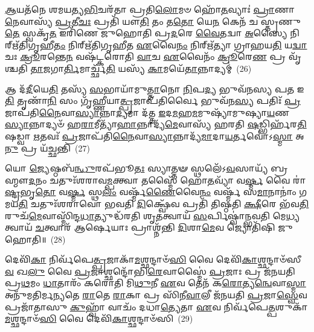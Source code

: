\-\ul{𑌆}\-𑌯𑌤᳴𑌨𑍇 𑌶𑌮𑌯𑌤𑍍𑌯\-\ul{𑌭𑌿}\-𑌚𑌰᳴𑌤𑌾 𑌪𑍍𑌰𑌤𑌿\-\ul{𑌲𑍋}\-𑌮𑍞 𑌹𑍋᳴\-\ul{𑌤}\-𑌵𑍍𑌯𑌾𑌃॑ \ul{𑌪𑍍𑌰𑌾}\-𑌣𑌾\-\ul{𑌨𑍇}\-𑌵𑌾𑌸𑍍𑌯᳴ \ul{𑌪𑍍𑌰}\-𑌤𑍀\-\ul{𑌚𑌃} 𑌪𑍍𑌰𑌤𑌿᳴ 𑌯𑍗\-\ul{𑌤𑌿} 𑌤𑌂 𑌤\-\ul{𑌤𑍋} 𑌯𑍇\-\ul{𑌨} 𑌕𑍇𑌨᳴ 𑌚 𑌸𑍍𑌤𑍃𑌣𑍁\-\ul{𑌤𑍇} 𑌸𑍍𑌵𑌕𑍃᳴\-\ul{𑌤} 𑌇𑌰𑌿᳴𑌣𑍇 𑌜𑍁𑌹𑍋𑌤𑌿 𑌪𑍍𑌰\-\ul{𑌦}\-𑌰𑍇 \ul{𑌵𑍈}\-𑌤𑌦𑍍𑌵𑌾 \ul{𑌅}\-𑌸𑍍𑌯𑍈 𑌨𑌿𑌰𑍍\mbox{}𑌋᳴𑌤𑌿𑌗𑍃𑌹𑍀\-\ul{𑌤𑌂} 𑌨𑌿𑌰𑍍\mbox{}𑌋᳴𑌤𑌿𑌗𑍃𑌹𑍀𑌤 \ul{𑌏}\-𑌵𑍈\-\ul{𑌨𑌂} 𑌨𑌿𑌰𑍍\mbox{}𑌋᳴𑌤𑍍𑌯𑌾 𑌗𑍍𑌰𑌾𑌹𑌯\-\ul{𑌤𑌿} 𑌯\-\ul{𑌦𑍍𑌵𑌾}\-𑌚𑌃 \ul{𑌕𑍍𑌰𑍂}\-𑌰𑌨𑍍𑌤𑍇\-\ul{𑌨} 𑌵𑌷᳴𑌟𑍍𑌕𑌰𑍋𑌤𑌿 \ul{𑌵𑌾}\-𑌚 \ul{𑌏}\-𑌵𑍈𑌨𑌂᳴ \ul{𑌕𑍍𑌰𑍂}\-𑌰𑍇\-\ul{𑌣} 𑌪𑍍𑌰 𑌵𑍃᳴𑌶𑍍𑌚𑌤𑌿 \ul{𑌤𑌾}\-𑌜𑌗𑌾\-\ul{𑌰𑍍𑌤𑌿}\-𑌮𑌾𑌰𑍍𑌚𑍍𑌛᳴\-\ul{𑌤𑌿} 𑌯𑌸𑍍𑌯᳴ \ul{𑌕𑌾}\-𑌮𑌯𑍇᳴\-\ul{𑌤𑌾}\-𑌨𑍍𑌨𑌾𑌦𑍍𑌯𑌮𑍍॑~(26)

𑌆 𑌦᳴\-\ul{𑌦𑍀}\-𑌯𑍇\-\ul{𑌤𑌿} 𑌤𑌸𑍍𑌯᳴ \ul{𑌸}\-𑌭𑌾𑌯𑌾᳴𑌮𑍁\-\ul{𑌤𑍍𑌤𑌾}\-𑌨𑍋 \ul{𑌨𑌿}\-𑌪\-\ul{𑌦𑍍𑌯} 𑌭𑍁𑌵᳴𑌨𑌸𑍍𑌯 𑌪\-\ul{𑌤} 𑌇\-\ul{𑌤𑌿} 𑌤𑍃𑌣𑌾᳴\-\ul{𑌨𑌿} 𑌸𑌂 𑌗𑍃᳴𑌹𑍍𑌣𑍀𑌯𑌾\-\ul{𑌤𑍍𑌪𑍍𑌰}\-𑌜𑌾𑌪᳴𑌤𑌿𑌰𑍍𑌵𑍈 𑌭𑍁𑌵᳴𑌨\-\ul{𑌸𑍍𑌯} 𑌪𑌤𑌿𑌃᳴ \ul{𑌪𑍍𑌰}\-𑌜𑌾𑌪᳴𑌤𑌿\-\ul{𑌨𑍈}\-𑌵𑌾\-\ul{𑌸𑍍𑌯𑌾}\-𑌨𑍍𑌨𑌾\-\ul{𑌦𑍍𑌯}\-𑌮𑌾 𑌦᳴𑌤𑍍𑌤 \ul{𑌇}\-𑌦\-\ul{𑌮}\-𑌹\-\ul{𑌮}\-𑌮𑍁𑌷𑍍𑌯𑌾᳴𑌮𑍁𑌷𑍍𑌯𑌾\-\ul{𑌯}\-𑌣\-\ul{𑌸𑍍𑌯𑌾}\-𑌨𑍍𑌨𑌾𑌦𑍍𑌯𑍞᳴ 𑌹\-\ul{𑌰𑌾}\-𑌮𑍀𑌤𑍍𑌯𑌾᳴\-\ul{𑌹𑌾}\-𑌨𑍍𑌨𑌾𑌦𑍍𑌯᳴\-\ul{𑌮𑍇}\-𑌵𑌾𑌸𑍍𑌯᳴ 𑌹𑌰𑌤𑌿 \ul{𑌷}\-𑌡𑍍𑌭𑌿𑌰𑍍\mbox{}𑌹᳴𑌰\-\ul{𑌤𑌿} 𑌷𑌡𑍍𑌵𑌾 \ul{𑌋}\-𑌤𑌵𑌃᳴ \ul{𑌪𑍍𑌰}\-𑌜𑌾𑌪᳴𑌤𑌿\-\ul{𑌨𑍈}\-𑌵𑌾\-\ul{𑌸𑍍𑌯𑌾}\-𑌨𑍍𑌨𑌾𑌦𑍍𑌯᳴\-\ul{𑌮𑌾}\-𑌦𑌾\-\ul{𑌯}\-𑌰𑍍𑌤𑌵𑍋॑\-𑌽\-\ul{𑌸𑍍𑌮𑌾} 𑌅\-\ul{𑌨𑍁} 𑌪𑍍𑌰 𑌯᳴𑌚𑍍𑌛𑌨𑍍𑌤𑌿~(27)

𑌯𑍋 \ul{𑌜𑍍𑌯𑍇}\-𑌷𑍍𑌠𑌬᳴\-\ul{𑌨𑍍𑌧𑍁}\-𑌰𑌪᳴𑌭𑍂\-\ul{𑌤𑌃} 𑌸𑍍𑌯𑌾𑌤𑍍𑌤𑍟 𑌸𑍍𑌥𑌲𑍇᳴\-𑌽\-\ul{𑌵}\-𑌸𑌾𑌯𑍍𑌯᳴ 𑌬𑍍𑌰𑌹𑍍𑌮𑍗\-\ul{𑌦}\-𑌨𑌂 𑌚𑌤𑍁𑌃᳴𑌶𑌰𑌾𑌵\-\ul{𑌮𑍍𑌪}\-𑌕𑍍𑌤𑍍𑌵𑌾 𑌤𑌸𑍍𑌮𑍈᳴ 𑌹𑍋\-\ul{𑌤}\-𑌵𑍍𑌯𑌾᳴ 𑌵\-\ul{𑌰𑍍𑌷𑍍𑌮} 𑌵𑍈 𑌰𑌾॑\-\ul{𑌷𑍍𑌟𑍍𑌰}\-𑌭𑍃\-\ul{𑌤𑍋} 𑌵\-\ul{𑌰𑍍𑌷𑍍𑌮} 𑌸𑍍𑌥\-\ul{𑌲𑌂} 𑌵𑌰𑍍𑌷𑍍𑌮᳴\-\ul{𑌣𑍈}\-𑌵𑍈\-\ul{𑌨𑌂} 𑌵𑌰𑍍𑌷𑍍𑌮᳴ 𑌸\-\ul{𑌮𑌾}\-𑌨𑌾𑌨𑌾𑌂॑ 𑌗𑌮𑌯\-\ul{𑌤𑌿} 𑌚𑌤𑍁𑌃᳴𑌶𑌰𑌾𑌵𑍋 𑌭𑌵𑌤𑌿 \ul{𑌦𑌿}\-𑌕𑍍𑌷𑍍𑌵𑍇᳴𑌵 𑌪𑍍𑌰𑌤𑌿᳴ 𑌤𑌿𑌷𑍍𑌠𑌤𑌿 \ul{𑌕𑍍𑌷𑍀}\-𑌰𑍇 𑌭᳴𑌵\-\ul{𑌤𑌿} 𑌰𑍁𑌚᳴\-\ul{𑌮𑍇}\-𑌵𑌾𑌸𑍍𑌮𑌿᳴\-𑌨𑍍𑌦\-\ul{𑌧𑌾}\-𑌤𑍍𑌯𑍁𑌦𑍍𑌧᳴𑌰𑌤𑌿 𑌶𑍃\-\ul{𑌤}\-𑌤𑍍𑌵𑌾𑌯᳴ \ul{𑌸}\-𑌰𑍍𑌪𑌿𑌷𑍍𑌵𑌾॑𑌨𑍍𑌭𑌵𑌤𑌿 𑌮𑍇\-\ul{𑌧𑍍𑌯}\-𑌤𑍍𑌵𑌾𑌯᳴ \ul{𑌚}\-𑌤𑍍𑌵𑌾𑌰᳴ 𑌆𑌰𑍍\mbox{}\-\ul{𑌷𑍇}\-𑌯𑌾𑌃 𑌪𑍍𑌰𑌾𑌶𑍍𑌨᳴𑌨𑍍𑌤𑌿 \ul{𑌦𑌿}\-𑌶𑌾\-\ul{𑌮𑍇}\-𑌵 𑌜𑍍𑌯𑍋𑌤𑌿᳴𑌷𑌿 𑌜𑍁𑌹𑍋𑌤𑌿॥~(28)

{\anuvakamend[{\-\ul{𑌗𑍍𑌰𑌾}\-𑌮𑍀 𑌯𑍁᳴𑌨\-\ul{𑌕𑍍𑌤𑍀}\-𑌧𑍍𑌮𑌃 𑌸𑍍𑌵 \ul{𑌏}\-𑌵𑍈𑌨𑌾᳴\-\ul{𑌨}\-𑌨𑍍𑌨𑌾𑌦𑍍𑌯𑌂᳴ 𑌯\-\ul{𑌚𑍍𑌛}\-𑌨𑍍𑌤𑍍𑌯𑍇\-\ul{𑌕𑌾}\-𑌨𑍍𑌨𑌪᳴\-\ul{𑌞𑍍𑌚𑌾}\-𑌶𑌚𑍍𑌚᳴}]}%

𑌦𑍇𑌵𑌿᳴\-\ul{𑌕𑌾} 𑌨𑌿𑌰𑍍𑌵᳴𑌪𑍇\-\ul{𑌤𑍍𑌪𑍍𑌰}\-𑌜𑌾𑌕𑌾᳴\-\ul{𑌮}\-𑌶𑍍𑌛𑌨𑍍𑌦𑌾𑍞᳴\-\ul{𑌸𑌿} 𑌵𑍈 𑌦𑍇𑌵𑌿᳴\-\ul{𑌕𑌾}\-𑌶𑍍𑌛𑌨𑍍𑌦𑌾𑍞᳴𑌸𑍀\-\ul{𑌵} 𑌖\-\ul{𑌲𑍁} 𑌵𑍈 \ul{𑌪𑍍𑌰}\-𑌜𑌾𑌶𑍍𑌛𑌨𑍍𑌦𑍋᳴𑌭𑌿\-\ul{𑌰𑍇}\-𑌵𑌾𑌸𑍍𑌮𑍈॑ \ul{𑌪𑍍𑌰}\-𑌜𑌾𑌃 𑌪𑍍𑌰 𑌜᳴𑌨𑌯𑌤𑌿 𑌪𑍍𑌰\-\ul{𑌥}\-𑌮𑌂 \ul{𑌧𑌾}\-𑌤𑌾𑌰𑌂᳴ 𑌕𑌰𑍋𑌤𑌿 𑌮𑌿\-\ul{𑌥𑍁}\-𑌨𑍀 \ul{𑌏}\-𑌵 𑌤𑍇𑌨᳴ 𑌕\-\ul{𑌰𑍋}\-𑌤𑍍𑌯\-\ul{𑌨𑍍𑌵𑍇}\-𑌵𑌾\-\ul{𑌸𑍍𑌮𑌾} 𑌅𑌨𑍁᳴𑌮𑌤𑌿𑌰𑍍𑌮𑌨𑍍𑌯𑌤𑍇 \ul{𑌰𑌾}\-𑌤𑍇 \ul{𑌰𑌾}\-𑌕𑌾 𑌪𑍍𑌰 𑌸𑌿᳴𑌨𑍀\-\ul{𑌵𑌾}\-𑌲𑍀 𑌜᳴𑌨𑌯𑌤𑌿 \ul{𑌪𑍍𑌰}\-𑌜𑌾\-\ul{𑌸𑍍𑌵𑍇}\-𑌵 𑌪𑍍𑌰𑌜𑌾᳴𑌤𑌾𑌸𑍁 \ul{𑌕𑍁}\-𑌹𑍍𑌵𑌾᳴ 𑌵𑌾𑌚𑌂᳴ 𑌦𑌧𑌾\-\ul{𑌤𑍍𑌯𑍇}\-𑌤𑌾 \ul{𑌏}\-𑌵 𑌨𑌿𑌰𑍍𑌵᳴𑌪𑍇\-\ul{𑌤𑍍𑌪}\-𑌶𑍁𑌕𑌾᳴\-\ul{𑌮}\-𑌶𑍍𑌛𑌨𑍍𑌦𑌾𑍞᳴\-\ul{𑌸𑌿} 𑌵𑍈 𑌦𑍇𑌵𑌿᳴\-\ul{𑌕𑌾}\-𑌶𑍍𑌛𑌨𑍍𑌦𑌾𑍞᳴𑌸𑌿~(29)

